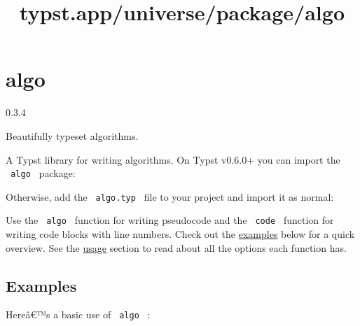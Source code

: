 \title{typst.app/universe/package/algo}

\label{banner}
\section{algo}\label{algo}

{ 0.3.4 }

Beautifully typeset algorithms.

\label{readme}
A Typst library for writing algorithms. On Typst v0.6.0+ you can import
the \texttt{\ algo\ } package:

\begin{Shaded}
\begin{Highlighting}[]
\end{Highlighting}
\end{Shaded}

Otherwise, add the \texttt{\ algo.typ\ } file to your project and import
it as normal:

\begin{Shaded}
\begin{Highlighting}[]
\end{Highlighting}
\end{Shaded}

Use the \texttt{\ algo\ } function for writing pseudocode and the
\texttt{\ code\ } function for writing code blocks with line numbers.
Check out the
\href{https://github.com/typst/packages/raw/main/packages/preview/algo/0.3.4/\#examples}{examples}
below for a quick overview. See the
\href{https://github.com/typst/packages/raw/main/packages/preview/algo/0.3.4/\#usage}{usage}
section to read about all the options each function has.

\subsection{Examples}\label{examples}

Hereâ€™s a basic use of \texttt{\ algo\ } :

\begin{Shaded}
\begin{Highlighting}[]
\NormalTok{)[}
\NormalTok{]}
\end{Highlighting}
\end{Shaded}

